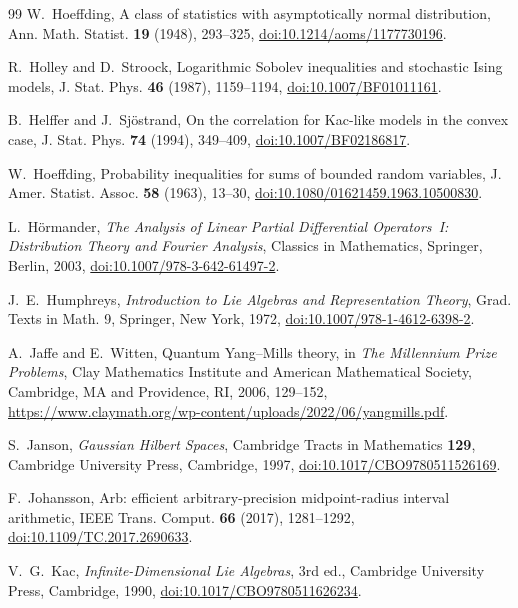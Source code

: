 \documentclass[aps,prd,twocolumn,superscriptaddress,nofootinbib,longbibliography,floatfix,amsmath,amssymb,10pt]{revtex4-2}
\theoremstyle{definition}
\theoremstyle{remark}
\begin{document}
\begin{thebibliography}{99}
W.~Hoeffding, A class of statistics with asymptotically normal distribution, Ann. Math. Statist. \textbf{19} (1948), 293--325, \href{https://doi.org/10.1214/aoms/1177730196}{doi:10.1214/aoms/1177730196}.

R.~Holley and D.~Stroock, Logarithmic Sobolev inequalities and stochastic
Ising models, J. Stat. Phys. \textbf{46} (1987), 1159--1194,
\href{https://doi.org/10.1007/BF01011161}{doi:10.1007/BF01011161}.

B.~Helffer and J.~Sj\"ostrand, On the correlation for Kac-like models in
the convex case, J. Stat. Phys. \textbf{74} (1994), 349--409,
\href{https://doi.org/10.1007/BF02186817}{doi:10.1007/BF02186817}.

W.~Hoeffding, Probability inequalities for sums of bounded random variables,
J. Amer. Statist. Assoc. \textbf{58} (1963), 13--30,
\href{https://doi.org/10.1080/01621459.1963.10500830}{doi:10.1080/01621459.1963.10500830}.

L.~H\"ormander, \emph{The Analysis of Linear Partial Differential
Operators~I: Distribution Theory and Fourier Analysis}, Classics in
Mathematics, Springer, Berlin, 2003,
\href{https://doi.org/10.1007/978-3-642-61497-2}{doi:10.1007/978-3-642-61497-2}.

J.~E.~Humphreys, \emph{Introduction to Lie Algebras and Representation
Theory}, Grad. Texts in Math. 9, Springer, New York, 1972,
\href{https://doi.org/10.1007/978-1-4612-6398-2}{doi:10.1007/978-1-4612-6398-2}.

A.~Jaffe and E.~Witten, Quantum Yang--Mills theory, in \emph{The Millennium
Prize Problems}, Clay Mathematics Institute and American Mathematical
Society, Cambridge, MA and Providence, RI, 2006, 129--152,
\url{https://www.claymath.org/wp-content/uploads/2022/06/yangmills.pdf}.

S.~Janson, \emph{Gaussian Hilbert Spaces}, Cambridge Tracts in Mathematics
\textbf{129}, Cambridge University Press, Cambridge, 1997,
\href{https://doi.org/10.1017/CBO9780511526169}{doi:10.1017/CBO9780511526169}.

F.~Johansson, Arb: efficient arbitrary-precision midpoint-radius interval
arithmetic, IEEE Trans. Comput. \textbf{66} (2017), 1281--1292,
\href{https://doi.org/10.1109/TC.2017.2690633}{doi:10.1109/TC.2017.2690633}.

V.~G.~Kac, \emph{Infinite-Dimensional Lie Algebras}, 3rd ed., Cambridge University Press, Cambridge, 1990, \href{https://doi.org/10.1017/CBO9780511626234}{doi:10.1017/CBO9780511626234}.


\end{thebibliography}
\end{document}
